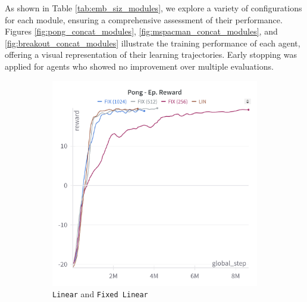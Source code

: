 As shown in Table \ref{tab:emb_siz_modules}, we explore a variety of configurations for each module, ensuring a comprehensive assessment of their performance. Figures \ref{fig:pong_concat_modules}, \ref{fig:mspacman_concat_modules}, and \ref{fig:breakout_concat_modules} illustrate the training performance of each agent, offering a visual representation of their learning trajectories. Early stopping was applied for agents who showed no improvement over multiple evaluations. 


\begin{figure}[ht]
    \centering
    \begin{subfigure}[b]{0.45\textwidth}
        \centering
        \includegraphics[width=\textwidth]{images/pong_lin_fix.png}
        \caption{\texttt{Linear} and \texttt{Fixed Linear}}
        \label{fig:pong_lin_fix}
    \end{subfigure}
    \hfill
    \begin{subfigure}[b]{0.45\textwidth}
        \centering

\end{subfigure}
\end{figure}
